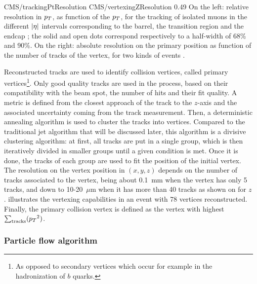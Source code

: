                      {CMS/trackingPtResolution}
                     {CMS/vertexingZResolution}
                     {0.49}
                     {On the left: relative resolution in $p_T$, as function of
                     the $p_T$, for the tracking of isolated muons in the
                     different $\left| \eta \right|$ intervals corresponding to the barrel,
                     the transition region and the endcap ; the solid and open
                     dots correspond respectively to a half-width of 68\% and
                     90\%. On the right: absolute resolution on the primary
                     position as function of the number of tracks of the vertex,
                     for two kinds of events \cite{CMStracking}.}

    Reconstructed tracks are used to identify collision vertices, called primary
    vertices\footnote{As opposed to secondary vertices which occur for example
    in the hadronization of $b$ quarks.}. Only good quality tracks are used in
    the process, based on their compatibility with the beam spot, the number of
    hits and their fit quality. A metric is defined from the closest approach of
    the track to the $z$-axis and the associated uncertainty coming from the
    track measurement. Then, a deterministic annealing algorithm
    \cite{DAclustering} is used to cluster the tracks into vertices. Compared to
    the traditional jet algorithm that will be discussed later, this algorithm
    is a divisive clustering algorithm: at first, all tracks are put in a single
    group, which is then iteratively divided in smaller groups until a given
    condition is met. Once it is done, the tracks of each group are used to fit
    the position of the initial vertex.  The resolution on the vertex position
    in $(x,y,z)$ depends on the number of tracks associated to the vertex, being
    about 0.1~mm when the vertex has only 5 tracks, and down to 10-20~$\mu$m
    when it has more than 40 tracks as shown on
     for $z$.  
    illustrates the vertexing capabilities in an event with 78 vertices
    reconstructed. Finally, the primary collision vertex is defined as the
    vertex with highest $\sum_\text{tracks} ({p_T}^2)$.


        \subsubsection{Particle flow algorithm}

